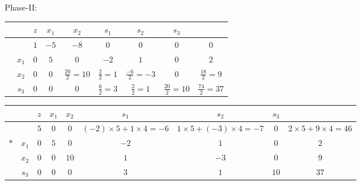 \documentclass[a4paper,12pt]{article}
\begin{document}
Phase-II:
\begin{table}[H]
    \tiny
    \begin{tabularx}{\textwidth}{cc|cccccc|c}
         &       & $z$ & $x_1$ & $x_2$               & $s_1$             & $s_2$               & $s_3$               &                     \\
        \hline
         &       & $1$ & $-5$  & $-8$                & $0$               & $0$                 & $0$                 & $0$                 \\
        \hline
         & $x_1$ & $0$ & $5$   & $0$                 & $-2$              & $1$                 & $0$                 & $2$                 \\
         & $x_2$ & $0$ & $0$   & $\frac{20}{2} = 10$ & $\frac{2}{2} = 1$ & $\frac{-6}{2} = -3$ & $0$                 & $\frac{18}{2} = 9$  \\
         & $s_3$ & $0$ & $0$   & $0$                 & $\frac{6}{2} = 3$ & $\frac{2}{2} = 1$   & $\frac{20}{2} = 10$ & $\frac{74}{2} = 37$ \\
    \end{tabularx}
\end{table}

\begin{table}[H]
    \tiny
    \begin{tabularx}{\textwidth}{cc|cccccc|c}
            &       & $z$ & $x_1$ & $x_2$ & $s_1$                             & $s_2$                             & $s_3$ &                                \\
        \hline
            &       & $5$ & $0$   & $0$   & $(-2) \times 5 + 1 \times 4 = -6$ & $1 \times 5 + (-3) \times 4 = -7$ & $0$   & $2 \times 5 + 9 \times 4 = 46$ \\
        \hline
        $*$ & $x_1$ & $0$ & $5$   & $0$   & $-2$                              & $1$                               & $0$   & $2$                            \\
            & $x_2$ & $0$ & $0$   & $10$  & $1$                               & $-3$                              & $0$   & $9$                            \\
            & $s_3$ & $0$ & $0$   & $0$   & $3$                               & $1$                               & $10$  & $37$                           \\
    \end{tabularx}
\end{table}
\end{document}
